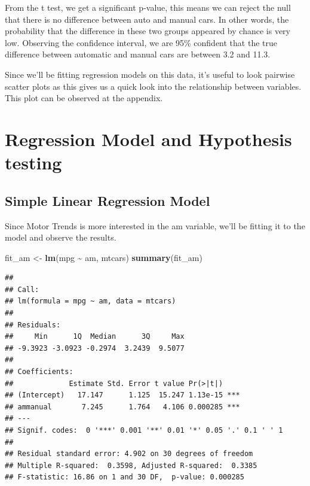 \documentclass[
]{article}
\newenvironment{Shaded}{\begin{snugshade}}{\end{snugshade}}
\newcommand{\FunctionTok}[1]{\textcolor[rgb]{0.13,0.29,0.53}{\textbf{#1}}}
\newcommand{\NormalTok}[1]{#1}
\newcommand{\OtherTok}[1]{\textcolor[rgb]{0.56,0.35,0.01}{#1}}
\newcommand{\SpecialCharTok}[1]{\textcolor[rgb]{0.81,0.36,0.00}{\textbf{#1}}}
\begin{document}
From the t test, we get a significant p-value, this means we can reject
the null that there is no difference between auto and manual cars. In
other words, the probability that the difference in these two groups
appeared by chance is very low. Observing the confidence interval, we
are 95\% confident that the true difference between automatic and manual
cars are between 3.2 and 11.3.

Since we'll be fitting regression models on this data, it's useful to
look pairwise scatter plots as this gives us a quick look into the
relationship between variables. This plot can be observed at the
appendix.

\section{Regression Model and Hypothesis
testing}\label{regression-model-and-hypothesis-testing}

\subsection{Simple Linear Regression
Model}\label{simple-linear-regression-model}

Since Motor Trends is more interested in the am variable, we'll be
fitting it to the model and observe the results.

\begin{Shaded}
\begin{Highlighting}[]
\NormalTok{fit\_am }\OtherTok{\textless{}{-}} \FunctionTok{lm}\NormalTok{(mpg }\SpecialCharTok{\textasciitilde{}}\NormalTok{ am, mtcars)}
\FunctionTok{summary}\NormalTok{(fit\_am) }
\end{Highlighting}
\end{Shaded}

\begin{verbatim}
## 
## Call:
## lm(formula = mpg ~ am, data = mtcars)
## 
## Residuals:
##     Min      1Q  Median      3Q     Max 
## -9.3923 -3.0923 -0.2974  3.2439  9.5077 
## 
## Coefficients:
##             Estimate Std. Error t value Pr(>|t|)    
## (Intercept)   17.147      1.125  15.247 1.13e-15 ***
## ammanual       7.245      1.764   4.106 0.000285 ***
## ---
## Signif. codes:  0 '***' 0.001 '**' 0.01 '*' 0.05 '.' 0.1 ' ' 1
## 
## Residual standard error: 4.902 on 30 degrees of freedom
## Multiple R-squared:  0.3598, Adjusted R-squared:  0.3385 
## F-statistic: 16.86 on 1 and 30 DF,  p-value: 0.000285
\end{verbatim}
\end{document}
